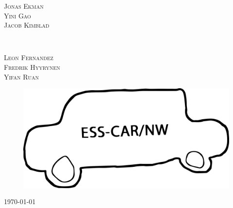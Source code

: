 \documentclass[11pt, titlepage]{article} %
\begin{document}
\begin{titlepage}
	\begin{minipage}{0.4\textwidth}
		\begin{flushleft}
			\large
                        \textsc{Jonas Ekman}
			\\
			\textsc{Yini Gao}
                        \\
                        \textsc{Jacob Kimblad}
		\end{flushleft}
	\end{minipage}
	~
	\begin{minipage}{0.4\textwidth}
		\begin{flushright}
			\large
                        \textsc{Leon Fernandez}
			\\
			\textsc{Fredrik Hyyrynen}
                        \\
                        \textsc{Yifan Ruan}
		\end{flushright}
	\end{minipage}
	
	\vskip 8cm
	\begin{figure}[H]
   		\centering
    	\includegraphics[scale=0.4]{funLogo.png}
	\end{figure}
	
	\vfill\vfill\vfill %
	
	{\large\today} %
	
	
	 
	
	\vfill %
	
\end{titlepage}
\end{document}
